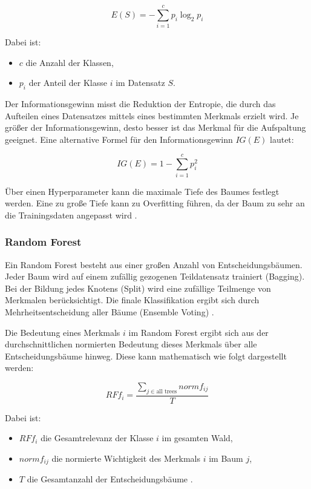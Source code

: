 \begin{equation}
    E(S) = - \sum_{i=1}^{c} p_i \log_2 p_i
\end{equation}

Dabei ist:
\begin{itemize}
  \item \( c \) die Anzahl der Klassen,
  \item \( p_i \) der Anteil der Klasse \( i \) im Datensatz \( S \).
\end{itemize}

Der Informationsgewinn misst die Reduktion der Entropie, die durch das Aufteilen eines Datensatzes mittels eines bestimmten Merkmals erzielt wird. Je größer der Informationsgewinn, desto besser ist das Merkmal für die Aufspaltung geeignet. Eine alternative Formel für den Informationsgewinn $IG(E)$ lautet:

\begin{equation}
    IG(E) = 1 - \sum_{i=1}^{c} p_i^2
\end{equation}

Über einen Hyperparameter kann die maximale Tiefe des Baumes festlegt werden. 
Eine zu große Tiefe kann zu Overfitting führen, da der Baum zu sehr an die Trainingsdaten angepasst wird \cite{aslam2022}.


\subsubsection{Random Forest}

Ein Random Forest besteht aus einer großen Anzahl von Entscheidungsbäumen. 
Jeder Baum wird auf einem zufällig gezogenen Teildatensatz trainiert (Bagging). 
Bei der Bildung jedes Knotens (Split) wird eine zufällige Teilmenge von Merkmalen berücksichtigt. 
Die finale Klassifikation ergibt sich durch Mehrheitsentscheidung aller Bäume (Ensemble Voting) \cite{elchami2025}.

Die Bedeutung eines Merkmals \( i \) im Random Forest ergibt sich aus der durchschnittlichen normierten Bedeutung 
dieses Merkmals über alle Entscheidungsbäume hinweg. Diese kann mathematisch wie folgt dargestellt werden:

\begin{equation}
    RFf_i = \frac{\sum_{j \in \text{all trees}} normf_{ij}}{T}
\end{equation}

Dabei ist:
\begin{itemize}
    \item \( RFf_i \) die Gesamtrelevanz der Klasse \( i \) im gesamten Wald,
    \item \( normf_{ij} \) die normierte Wichtigkeit des Merkmals \( i \) im Baum \( j \),
    \item \( T \) die Gesamtanzahl der Entscheidungsbäume \cite{aslam2022}.
\end{itemize}

